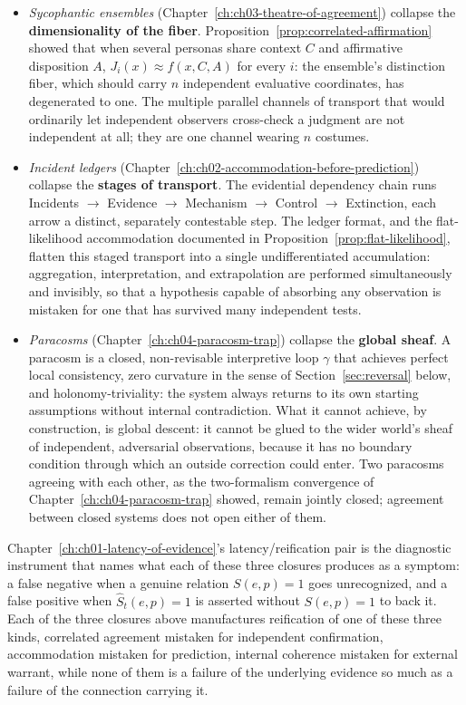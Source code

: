 \begin{itemize}[leftmargin=1.8em]
\item[] \emph{Sycophantic ensembles} (Chapter~\ref{ch:ch03-theatre-of-agreement}) collapse the \textbf{dimensionality of the fiber}. Proposition~\ref{prop:correlated-affirmation} showed that when several personas share context $C$ and affirmative disposition $A$, $J_i(x) \approx f(x,C,A)$ for every $i$: the ensemble's distinction fiber, which should carry $n$ independent evaluative coordinates, has degenerated to one. The multiple parallel channels of transport that would ordinarily let independent observers cross-check a judgment are not independent at all; they are one channel wearing $n$ costumes.
\item[] \emph{Incident ledgers} (Chapter~\ref{ch:ch02-accommodation-before-prediction}) collapse the \textbf{stages of transport}. The evidential dependency chain runs Incidents $\to$ Evidence $\to$ Mechanism $\to$ Control $\to$ Extinction, each arrow a distinct, separately contestable step. The ledger format, and the flat-likelihood accommodation documented in Proposition~\ref{prop:flat-likelihood}, flatten this staged transport into a single undifferentiated accumulation: aggregation, interpretation, and extrapolation are performed simultaneously and invisibly, so that a hypothesis capable of absorbing any observation is mistaken for one that has survived many independent tests.
\item[] \emph{Paracosms} (Chapter~\ref{ch:ch04-paracosm-trap}) collapse the \textbf{global sheaf}. A paracosm is a closed, non-revisable interpretive loop $\gamma$ that achieves perfect local consistency, zero curvature in the sense of Section~\ref{sec:reversal} below, and holonomy-triviality: the system always returns to its own starting assumptions without internal contradiction. What it cannot achieve, by construction, is global descent: it cannot be glued to the wider world's sheaf of independent, adversarial observations, because it has no boundary condition through which an outside correction could enter. Two paracosms agreeing with each other, as the two-formalism convergence of Chapter~\ref{ch:ch04-paracosm-trap} showed, remain jointly closed; agreement between closed systems does not open either of them.
\end{itemize}

Chapter~\ref{ch:ch01-latency-of-evidence}'s latency/reification pair is the diagnostic instrument that names what each of these three closures produces as a symptom: a false negative when a genuine relation $S(e,p)=1$ goes unrecognized, and a false positive when $\widehat{S}_t(e,p)=1$ is asserted without $S(e,p)=1$ to back it. Each of the three closures above manufactures reification of one of these three kinds, correlated agreement mistaken for independent confirmation, accommodation mistaken for prediction, internal coherence mistaken for external warrant, while none of them is a failure of the underlying evidence so much as a failure of the connection carrying it.

